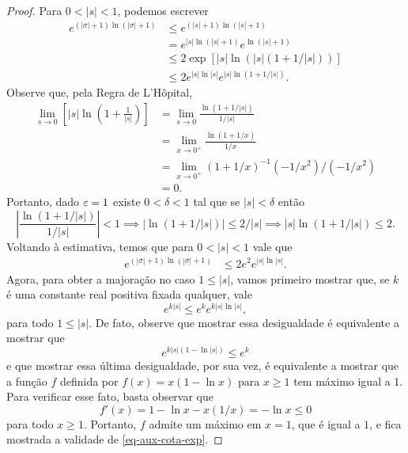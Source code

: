 \begin{proof}
        Para $0 < |s| < 1$, podemos escrever
        \begin{align*}
            e^{(|\sigma|+1)\ln(|\sigma|+1)} &\leq e^{(|s|+1)\ln(|s|+1)} \\
                                            &= e^{|s|\ln(|s|+1)}e^{\ln(|s|+1)} \\
                                            &\leq 2\exp\left[ |s|\ln\left( |s|(1 + 1/|s|) \right) \right] \\
                                            &\leq 2e^{|s|\ln|s|}e^{|s|\ln(1 + 1/|s|)}.
        \end{align*}
        Observe que, pela Regra de L'Hôpital,
        \begin{align*}
            \lim_{s\to 0} \left[ |s|\ln\left( 1 + \frac{1}{|s|} \right) \right]
            &= \lim_{s\to 0} \frac{\ln(1 + 1/|s|)}{1/|s|} \\
            &= \lim_{x\to 0^+} \frac{\ln(1 + 1/x)}{1/x} \\
            &= \lim_{x\to 0^+} (1 + 1/x)^{-1}(-1/x^2)/(-1/x^2) \\
            &= 0.
        \end{align*}
        Portanto, dado $\varepsilon=1$ existe $0<\delta<1$ tal que se $|s|<\delta$ então
        \[
        \left| \frac{\ln(1 + 1/|s|)}{1/|s|} \right| < 1 \implies |\ln(1 + 1/|s|)| \leq 2/|s| 
                                                        \implies |s|\ln(1+1/|s|) \leq 2.
        \]
        Voltando à estimativa, temos que para $0<|s|<1$ vale que
        \begin{align*}
            e^{(|\sigma|+1)\ln(|\sigma|+1)} &\leq 2e^2e^{|s|\ln|s|}.
        \end{align*}
        Agora, para obter a majoração no caso $1\leq|s|$, vamos primeiro mostrar que, se $k$
        é uma constante real positiva fixada qualquer, vale
        \begin{equation}
        \label{eq-aux-cota-exp}    
            e^{k|s|} \leq e^k e^{k|s|\ln|s|},
        \end{equation}
        para todo $1\leq|s|$. De fato, observe que mostrar essa desigualdade é equivalente a 
        mostrar que
        \[
        e^{k|s|(1 - \ln|s|)} \leq e^k
        \]
        e que mostrar essa última desigualdade, por sua vez, é equivalente a mostrar que
        a função $f$ definida por $f(x) = x(1-\ln x)$ para $x\geq 1$ tem máximo igual a 1.
        Para verificar esse fato, basta observar que
        \[
        f'(x) = 1 - \ln x - x(1/x) = -\ln x \leq 0
        \]
        para todo $x\geq 1$. Portanto, $f$ admite um máximo em $x=1$, que é igual a $1$,
        e fica mostrada a validade de \eqref{eq-aux-cota-exp}.
        

\end{proof}
